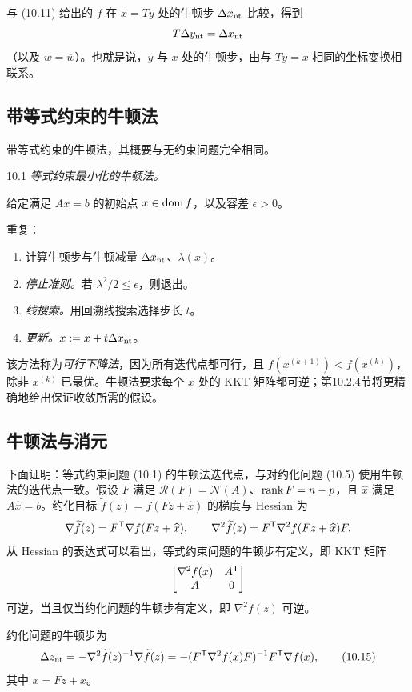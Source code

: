 与 (10.11) 给出的 $f$ 在 $x=Ty$ 处的牛顿步 $\Delta x_{\rm nt}$ 比较，得到
\[T\Delta y_{\rm nt}=\Delta x_{\rm nt}\]
（以及 $w=\overline w$）。也就是说，$y$ 与 $x$ 处的牛顿步，由与 $Ty=x$ 相同的坐标变换相联系。

\subsection{带等式约束的牛顿法}
带等式约束的牛顿法，其概要与无约束问题完全相同。
\begin{origalgorithm}{10.1}
\emph{等式约束最小化的牛顿法。}

给定满足 $Ax=b$ 的初始点 $x\in\operatorname{dom} f$，以及容差 $\epsilon>0$。

重复：
\begin{enumerate}
\item 计算牛顿步与牛顿减量 $\Delta x_{\rm nt}$、$\lambda(x)$。
\item \emph{停止准则。}若 $\lambda^2/2\le\epsilon$，则退出。
\item \emph{线搜索。}用回溯线搜索选择步长 $t$。
\item \emph{更新。}$x:=x+t\Delta x_{\rm nt}$。
\end{enumerate}
\end{origalgorithm}
该方法称为\emph{可行下降法}，因为所有迭代点都可行，且 $f(x^{(k+1)})<f(x^{(k)})$，除非 $x^{(k)}$ 已最优。牛顿法要求每个 $x$ 处的 KKT 矩阵都可逆；第10.2.4节将更精确地给出保证收敛所需的假设。

\subsection{牛顿法与消元}
下面证明：等式约束问题 (10.1) 的牛顿法迭代点，与对约化问题 (10.5) 使用牛顿法的迭代点一致。假设 $F$ 满足 $\mathcal R(F)=\mathcal N(A)$、$\operatorname{rank} F=n-p$，且 $\widehat x$ 满足 $A\widehat x=b$。约化目标 $\widetilde f(z)=f(Fz+\widehat x)$ 的梯度与 Hessian 为
\[\nabla\widetilde f(z)=F^\mathsf T\nabla f(Fz+\widehat x),\qquad\nabla^2\widetilde f(z)=F^\mathsf T\nabla^2f(Fz+\widehat x)F.\]
从 Hessian 的表达式可以看出，等式约束问题的牛顿步有定义，即 KKT 矩阵
\[\begin{bmatrix}\nabla^2f(x)&A^\mathsf T\\A&0\end{bmatrix}\]
可逆，当且仅当约化问题的牛顿步有定义，即 $\nabla^2\widetilde f(z)$ 可逆。

约化问题的牛顿步为
\begin{equation}\Delta z_{\rm nt}=-\nabla^2\widetilde f(z)^{-1}\nabla\widetilde f(z)=-(F^\mathsf T\nabla^2f(x)F)^{-1}F^\mathsf T\nabla f(x),\tag{10.15}\end{equation}
其中 $x=Fz+\widehat x$。

